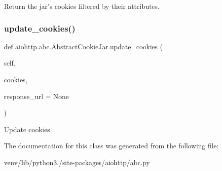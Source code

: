 \begin{DoxyVerb}Return the jar's cookies filtered by their attributes.\end{DoxyVerb}
 \mbox{\label{classaiohttp_1_1abc_1_1_abstract_cookie_jar_a0d992539787adb16027c9e959c8e699b}} 
\subsubsection{\texorpdfstring{update\+\_\+cookies()}{update\_cookies()}}
{\footnotesize\ttfamily def aiohttp.\+abc.\+Abstract\+Cookie\+Jar.\+update\+\_\+cookies (\begin{DoxyParamCaption}\item[{}]{self,  }\item[{}]{cookies,  }\item[{}]{response\+\_\+url = {\ttfamily None} }\end{DoxyParamCaption})}

\begin{DoxyVerb}Update cookies.\end{DoxyVerb}
 

The documentation for this class was generated from the following file\+:\begin{DoxyCompactItemize}
\item 
venv/lib/python3./site-\/packages/aiohttp/abc.\+py\end{DoxyCompactItemize}
